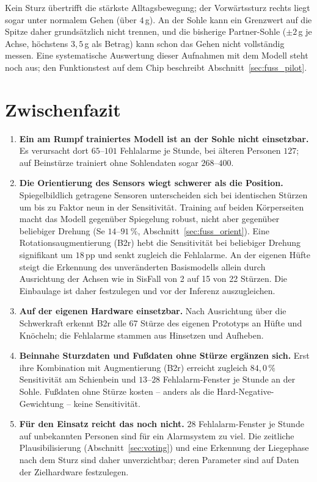 \documentclass[11pt,a4paper,oneside]{report}
\begin{document}
Kein Sturz übertrifft die stärkste Alltagsbewegung; der Vorwärtssturz
rechts liegt sogar unter normalem Gehen (über $4$\,g). An der Sohle kann
ein Grenzwert auf die Spitze daher grundsätzlich nicht trennen, und die
bisherige Partner-Sohle ($\pm 2$\,g je Achse, höchstens $3{,}5$\,g als
Betrag) kann schon das Gehen nicht vollständig messen. Eine
systematische Auswertung dieser Aufnahmen mit dem Modell steht noch
aus; den Funktionstest auf dem Chip beschreibt
Abschnitt~\ref{sec:fuss_pilot}.

\section{Zwischenfazit}
\label{sec:fuss_fazit}

\begin{enumerate}
\item \textbf{Ein am Rumpf trainiertes Modell ist an der Sohle nicht
      einsetzbar.} Es verursacht dort $65$--$101$ Fehlalarme je Stunde,
      bei älteren Personen $127$; auf Beinstürze trainiert ohne
      Sohlendaten sogar $268$--$400$.
\item \textbf{Die Orientierung des Sensors wiegt schwerer als die
      Position.} Spiegelbildlich getragene Sensoren unterscheiden sich
      bei identischen Stürzen um bis zu Faktor neun in der
      Sensitivität. Training auf beiden Körperseiten macht das Modell
      gegenüber Spiegelung robust, nicht aber gegenüber beliebiger
      Drehung (Se $14$--$91\,\%$, Abschnitt~\ref{sec:fuss_orient}).
      Eine Rotationsaugmentierung (B2r) hebt die Sensitivität bei
      beliebiger Drehung signifikant um $18$\,pp und senkt zugleich die
      Fehlalarme. An der eigenen Hüfte steigt die Erkennung des
      unveränderten Basismodells allein durch Ausrichtung der Achsen
      wie in SisFall von 2 auf 15 von 22 Stürzen. Die Einbaulage ist
      daher festzulegen und vor der Inferenz auszugleichen.
\item \textbf{Auf der eigenen Hardware einsetzbar.} Nach Ausrichtung
      über die Schwerkraft erkennt B2r alle 67 Stürze des eigenen
      Prototyps an Hüfte und Knöcheln; die Fehlalarme stammen aus
      Hinsetzen und Aufheben.
\item \textbf{Beinnahe Sturzdaten und Fußdaten ohne Stürze ergänzen
      sich.} Erst ihre Kombination mit Augmentierung (B2r) erreicht
      zugleich $84{,}0\,\%$ Sensitivität am Schienbein und $13$--$28$
      Fehlalarm-Fenster je Stunde an der Sohle. Fußdaten ohne Stürze
      kosten -- anders als die Hard-Negative-Gewichtung -- keine
      Sensitivität.
\item \textbf{Für den Einsatz reicht das noch nicht.} $28$
      Fehlalarm-Fenster je Stunde auf unbekannten Personen sind für ein
      Alarmsystem zu viel. Die zeitliche Plausibilisierung
      (Abschnitt~\ref{sec:voting}) und eine Erkennung der
      Liegephase nach dem Sturz sind daher unverzichtbar; deren
      Parameter sind auf Daten der Zielhardware festzulegen.
\end{enumerate}
\end{document}
